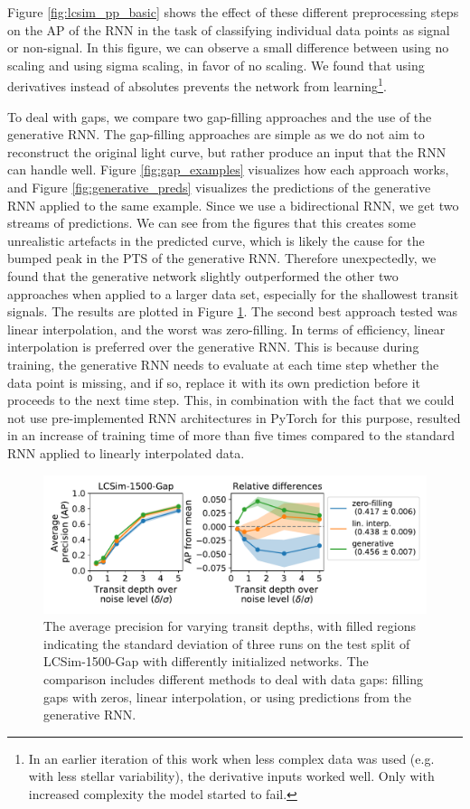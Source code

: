 Figure \ref{fig:lcsim_pp_basic} shows the effect of these different preprocessing steps on the AP of the RNN in the task of classifying individual data points as signal or non-signal. In this figure, we can observe a small difference between using no scaling and using sigma scaling, in favor of no scaling. We found that using derivatives instead of absolutes prevents the network from learning\footnote{In an earlier iteration of this work when less complex data was used (e.g. with less stellar variability), the derivative inputs worked well. Only with increased complexity the model started to fail.}.

To deal with gaps, we compare two gap-filling approaches and the use of the generative RNN. The gap-filling approaches are simple as we do not aim to reconstruct the original light curve, but rather produce an input that the RNN can handle well. Figure \ref{fig:gap_examples} visualizes how each approach works, and Figure \ref{fig:generative_preds} visualizes the predictions of the generative RNN applied to the same example. Since we use a bidirectional RNN, we get two streams of predictions. We can see from the figures that this creates some unrealistic artefacts in the predicted curve, which is likely the cause for the bumped peak in the PTS of the generative RNN. Therefore unexpectedly, we found that the generative network slightly outperformed the other two approaches when applied to a larger data set, especially for the shallowest transit signals. The results are plotted in Figure \ref{fig:lcsim_gaps}. The second best approach tested was linear interpolation, and the worst was zero-filling. In terms of efficiency, linear interpolation is preferred over the generative RNN. This is because during training, the generative RNN needs to evaluate at each time step whether the data point is missing, and if so, replace it with its own prediction before it proceeds to the next time step. This, in combination with the fact that we could not use pre-implemented RNN architectures in PyTorch for this purpose, resulted in an increase of training time of more than five times compared to the standard RNN applied to linearly interpolated data.

\begin{figure}
    \centering
    \includegraphics[width=0.7\linewidth]{Experiments/Figures/Preprocessing/lcsim1500_AP_pp-gaps.pdf}
    \caption{The average precision for varying transit depths, with filled regions indicating the standard deviation of three runs on the test split of LCSim-1500-Gap with differently initialized networks. The comparison includes different methods to deal with data gaps: filling gaps with zeros, linear interpolation, or using predictions from the generative RNN.}
    \label{fig:lcsim_gaps}
\end{figure}


